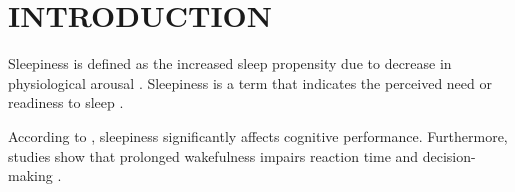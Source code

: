 \documentclass[hidelinks, a4paper,12pt,twoside]{report} %
\begin{document}
\pagestyle{plain}\cleardoublepage %


	
	 
\chapter{INTRODUCTION} %

Sleepiness is defined as the increased sleep propensity due to decrease in physiological arousal \parencite{Lal_2005as, Vassalli2009}. Sleepiness is a term that indicates the perceived need or readiness to sleep \parencite{Amso_2015}.

According to \textcite{Lal_2005as}, sleepiness significantly affects cognitive performance. Furthermore, studies show that prolonged wakefulness impairs reaction time and decision-making \parencite{Vassalli2009}.

\clearpage

\begin{singlespace}
	\smallskip
	\printbibliography[heading=bibintoc, title=REFERENCES] %
\end{singlespace}
\end{document}
